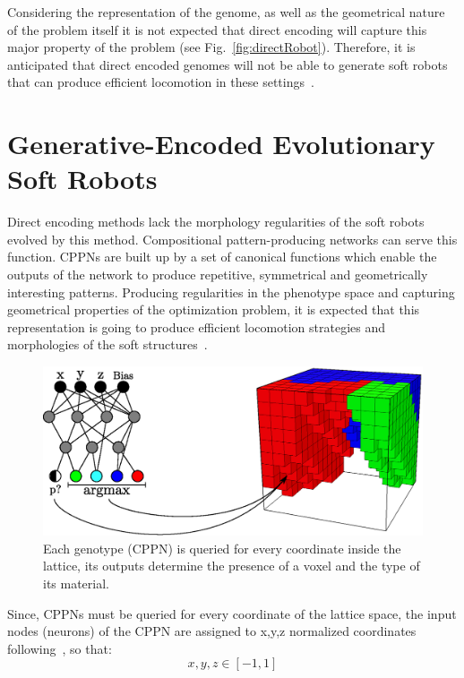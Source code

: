 Considering the representation of the genome, as well as the geometrical nature of the problem itself it is not expected that direct encoding will capture this major property of the problem (see Fig.~\ref{fig:directRobot}). Therefore, it is anticipated that direct encoded genomes will not be able to generate soft robots that can produce efficient locomotion in these settings~\citep{cheney2013unshackling}.





\section{Generative-Encoded Evolutionary Soft Robots}

Direct encoding methods lack the morphology regularities of the soft robots evolved by this method. Compositional pattern-producing networks can serve this function. CPPNs are built up by a set of canonical functions which enable the outputs of the network to produce repetitive, symmetrical and geometrically interesting patterns. Producing regularities in the phenotype space and capturing geometrical properties of the optimization problem, it is expected that this representation is going to produce efficient locomotion strategies and morphologies of the soft structures~\citep{cheney2013unshackling}.
\begin{figure}
\centering
\includegraphics[height=0.2\textheight]{../Figures/Misc/cppnSoftBot.eps}
\caption{Each genotype (CPPN) is queried for every coordinate inside the lattice, its outputs determine the presence of a voxel and the type of its material.}
\label{fig:cppnDiagram}
\end{figure}
Since, CPPNs must be queried for every coordinate of the lattice space, the input nodes (neurons) of the CPPN are assigned to x,y,z normalized coordinates following~\citep{cheney2013unshackling}, so that:
\[x,y,z \in [-1,1]\]
